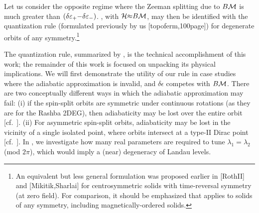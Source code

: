 \documentclass[aps, prb, showpacs, twocolumn, notitlepage, superscriptaddress]{revtex4-1}
\begin{document}
 Let us consider the opposite regime where the Zeeman splitting due to $B{\cal M}$ is much greater than $(\delta \varepsilon_+{-}\delta\varepsilon_-)$. , with ${\cal H}{\approx}B{\cal M}$, may then be identified with the quantization rule (formulated previously by us [topoferm,100page]) for degenerate orbits of any symmetry.\footnote{An equivalent but less general formulation was proposed earlier in [RothII] and [Mikitik,Sharlai] for centrosymmetric solids with time-reversal symmetry (at zero field). For comparison, it should be emphasized that  applies to solids of any symmetry, including magnetically-ordered solids.}	   














The quantization rule, summarized by , is the technical accomplishment of this work; the remainder of this work is focused on unpacking its physical implications. We will first demonstrate the utility of our rule in case studies where the adiabatic approximation is invalid, and $\delta \epsilon$ competes with $B{\cal M}$. There are two conceptually different ways in which the adiabatic approximation may fail: (i) if the spin-split orbits are  symmetric under continuous rotations (as they are for the Rashba 2DEG), then adiabaticity may be lost over the entire orbit [cf.\ ]. (ii) For asymmetric spin-split orbits, adiabaticity may be lost in the vicinity of a single isolated point, where orbits intersect at a type-II Dirac point [cf.\ ]. 
In , we investigate how many real parameters are required to tune $\lambda_1{=}\lambda_2$ (mod $2\pi$), which would imply a (near) degeneracy of Landau levels.  
\end{document}
